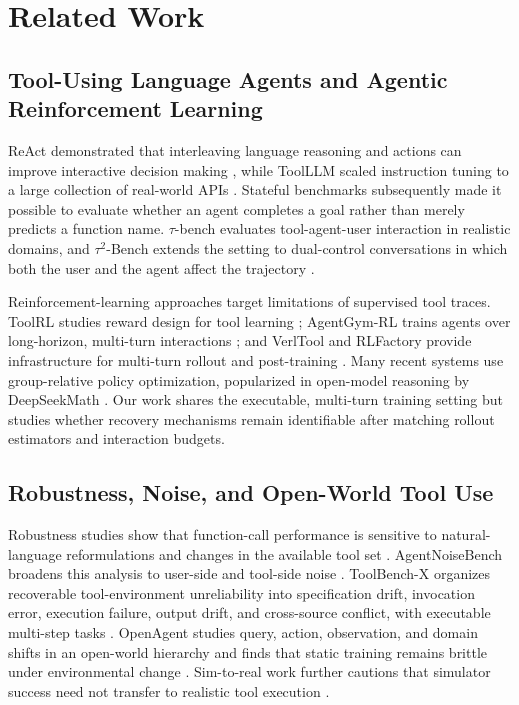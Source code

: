 \section{Related Work}
\label{sec:related-work}

\subsection{Tool-Using Language Agents and Agentic Reinforcement Learning}

ReAct demonstrated that interleaving language reasoning and actions can improve
interactive decision making \citep{yao2023react}, while ToolLLM scaled
instruction tuning to a large collection of real-world APIs
\citep{qin2024toolllm}. Stateful benchmarks subsequently made it possible to
evaluate whether an agent completes a goal rather than merely predicts a
function name. $\tau$-bench evaluates tool-agent-user interaction in realistic
domains, and $\tau^2$-Bench extends the setting to dual-control conversations in
which both the user and the agent affect the trajectory
\citep{yao2024taubench,barres2025tau2bench}.

Reinforcement-learning approaches target limitations of supervised tool traces.
ToolRL studies reward design for tool learning \citep{qian2025toolrl};
AgentGym-RL trains agents over long-horizon, multi-turn interactions
\citep{xi2025agentgymrl}; and VerlTool and RLFactory provide infrastructure for
multi-turn rollout and post-training \citep{jiang2025verltool,chai2025rlfactory}.
Many recent systems use group-relative policy optimization, popularized in
open-model reasoning by DeepSeekMath \citep{shao2024deepseekmath}. Our work
shares the executable, multi-turn training setting but studies whether recovery
mechanisms remain identifiable after matching rollout estimators and interaction
budgets.

\subsection{Robustness, Noise, and Open-World Tool Use}

Robustness studies show that function-call performance is sensitive to
natural-language reformulations and changes in the available tool set
\citep{rabinovich2025robustness}. AgentNoiseBench broadens this analysis to
user-side and tool-side noise \citep{wang2026agentnoisebench}. ToolBench-X
organizes recoverable tool-environment unreliability into specification drift,
invocation error, execution failure, output drift, and cross-source conflict,
with executable multi-step tasks \citep{tian2026unreliability}. OpenAgent
studies query, action, observation, and domain shifts in an open-world hierarchy
and finds that static training remains brittle under environmental change
\citep{lv2026openagent}. Sim-to-real work further cautions that simulator success
need not transfer to realistic tool execution \citep{zhou2026simulationlies}.


